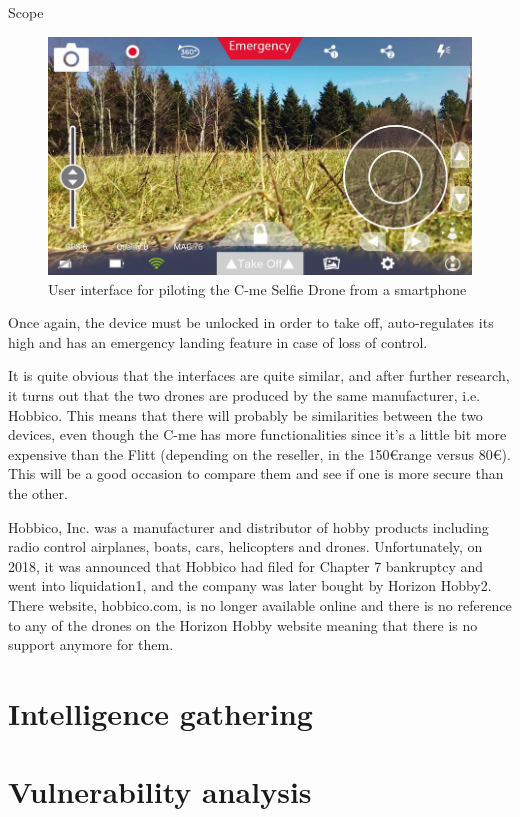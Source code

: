 \begin{chaptercover}{Scope}
\begin{figure}[H]
  \centering
  \includegraphics[width=0.7\linewidth]{figures/cme-selfie-drone-ui}
  \caption{User interface for piloting the C-me Selfie Drone from a smartphone}
  \label{fig:flitt-selfie-cam}
\end{figure}

Once again, the device must be unlocked in order to take off, auto-regulates its high and has an emergency landing feature in case of loss of control.

\begin{tip}
It is quite obvious that the interfaces are quite similar, and after further research, it turns out that the two drones are produced by the same manufacturer, i.e. Hobbico. This means that there will probably be similarities between the two devices, even though the C-me has more functionalities since it’s a little bit more expensive than the Flitt (depending on the reseller, in the 150\euro range versus 80\euro). This will be a good occasion to compare them and see if one is more secure than the other.

Hobbico, Inc. was a manufacturer and distributor of hobby products including radio control airplanes, boats, cars, helicopters and drones. Unfortunately, on 2018, it was announced that Hobbico had filed for Chapter 7 bankruptcy and went into liquidation1, and the company was later bought by Horizon Hobby2. There website, hobbico.com, is no longer available online and there is no reference to any of the drones on the Horizon Hobby website meaning that there is no support anymore for them.
\end{tip}

\section{Intelligence gathering}


\section{Vulnerability analysis}


\end{chaptercover}
